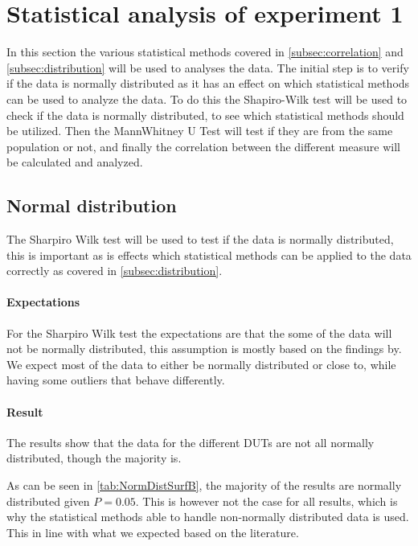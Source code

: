 \section{Statistical analysis of experiment 1}\label{sec:Stat1}

In this section the various statistical methods covered in \cref{subsec:correlation} and \cref{subsec:distribution} will be used to analyses the data. The initial step is to verify if the data is normally distributed as it has an effect on which statistical methods can be used to analyze the data. To do this the Shapiro-Wilk test will be used to check if the data is normally distributed, to see which statistical methods should be utilized. Then the MannWhitney U Test will test if they are from the same population or not, and finally the correlation between the different measure will be calculated and analyzed.

\subsection{Normal distribution}\label{subsec:NormalDist1}

The Sharpiro Wilk test will be used to test if the data is normally distributed, this is important as is effects which statistical methods can be applied to the data correctly as covered in \cref{subsec:distribution}. 

\paragraph{Expectations}
For the Sharpiro Wilk test the expectations are that the some of the data will not be normally distributed, this assumption is mostly based on the findings by\cite{Koedijk2022diff}. We expect most of the data to either be normally distributed or close to, while having some outliers that behave differently.

\paragraph{Result}
The results show that the data for the different DUTs are not all normally distributed, though the majority is.

As can be seen in \cref{tab:NormDistSurfB}, the majority of the results are normally distributed given $P = 0.05$. This is however not the case for all results, which is why the statistical methods able to handle non-normally distributed data is used. This in line with what we expected based on the literature.

